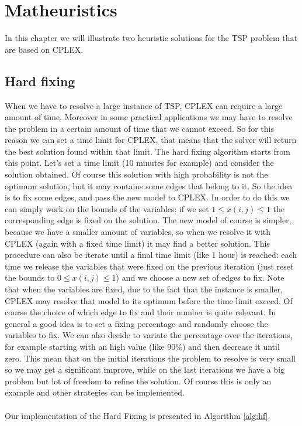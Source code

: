 \chapter{Matheuristics}
In this chapter we will illustrate two heuristic solutions for the TSP problem that are based on CPLEX.

\section{Hard fixing}
When we have to resolve a large instance of TSP, CPLEX can require a large amount of time. Moreover in some practical applications we may have to resolve the problem in a certain amount of time that we cannot exceed. So for this reason we can set a time limit for CPLEX, that means that the solver will return the best solution found within that limit. The hard fixing algorithm starts from this point. Let's set a time limit (10 minutes for example) and consider the solution obtained. Of course this solution with high probability is not the optimum solution, but it may contains some edges that belong to it. So the idea is to fix some edges, and pass the new model to CPLEX. In order to do this we can simply work on the bounds of the variables: if we set $1 \leq x(i,j) \leq 1$ the corresponding edge is fixed on the solution. The new model of course is simpler, because we have a smaller amount of variables, so when we resolve it with CPLEX (again with a fixed time limit) it may find a better solution. This procedure can also be iterate until a final time limit (like 1 hour) is reached: each time we release the variables that were fixed on the previous iteration (just reset the bounds to $0 \leq x(i,j) \leq 1$) and we choose a new set of edges to fix.
Note that when the variables are fixed, due to the fact that the instance is smaller, CPLEX may resolve that model to its optimum before the time limit exceed.
Of course the choice of which edge to fix and their number is quite relevant. In general a good idea is to set a fixing percentage and randomly choose the variables to fix. We can also decide to variate the percentage over the iterations, for example starting with an high value (like 90\%) and then decrease it until zero. This mean that on the initial iterations the problem to resolve is very small so we may get a significant improve, while on the last iterations we have a big problem but lot of freedom to refine the solution. Of course this is only an example and other strategies can be implemented.  
\\\\ Our implementation of the Hard Fixing is presented in Algorithm \ref{alg:hf}. 

